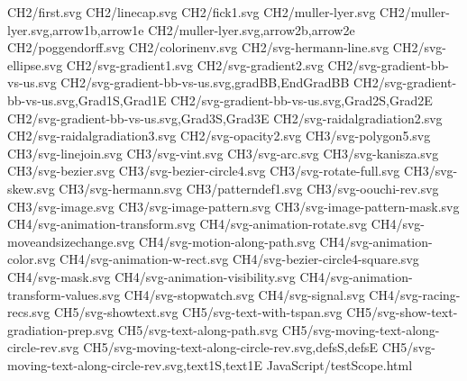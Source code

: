CH2/first.svg
CH2/linecap.svg
CH2/fick1.svg
CH2/muller-lyer.svg
CH2/muller-lyer.svg,arrow1b,arrow1e
CH2/muller-lyer.svg,arrow2b,arrow2e
CH2/poggendorff.svg
CH2/colorinenv.svg
CH2/svg-hermann-line.svg
CH2/svg-ellipse.svg
CH2/svg-gradient1.svg
CH2/svg-gradient2.svg
CH2/svg-gradient-bb-vs-us.svg
CH2/svg-gradient-bb-vs-us.svg,gradBB,EndGradBB
CH2/svg-gradient-bb-vs-us.svg,Grad1S,Grad1E
CH2/svg-gradient-bb-vs-us.svg,Grad2S,Grad2E
CH2/svg-gradient-bb-vs-us.svg,Grad3S,Grad3E
CH2/svg-raidalgradiation2.svg
CH2/svg-raidalgradiation3.svg
CH2/svg-opacity2.svg
CH3/svg-polygon5.svg
CH3/svg-linejoin.svg
CH3/svg-vint.svg
CH3/svg-arc.svg
CH3/svg-kanisza.svg
CH3/svg-bezier.svg
CH3/svg-bezier-circle4.svg
CH3/svg-rotate-full.svg
CH3/svg-skew.svg
CH3/svg-hermann.svg
CH3/patterndef1.svg
CH3/svg-oouchi-rev.svg
CH3/svg-image.svg
CH3/svg-image-pattern.svg
CH3/svg-image-pattern-mask.svg
CH4/svg-animation-transform.svg
CH4/svg-animation-rotate.svg
CH4/svg-moveandsizechange.svg
CH4/svg-motion-along-path.svg
CH4/svg-animation-color.svg
CH4/svg-animation-w-rect.svg
CH4/svg-bezier-circle4-square.svg
CH4/svg-mask.svg
CH4/svg-animation-visibility.svg
CH4/svg-animation-transform-values.svg
CH4/svg-stopwatch.svg
CH4/svg-signal.svg
CH4/svg-racing-recs.svg
CH5/svg-showtext.svg
CH5/svg-text-with-tspan.svg
CH5/svg-show-text-gradiation-prep.svg
CH5/svg-text-along-path.svg
CH5/svg-moving-text-along-circle-rev.svg
CH5/svg-moving-text-along-circle-rev.svg,defsS,defsE
CH5/svg-moving-text-along-circle-rev.svg,text1S,text1E
JavaScript/testScope.html
